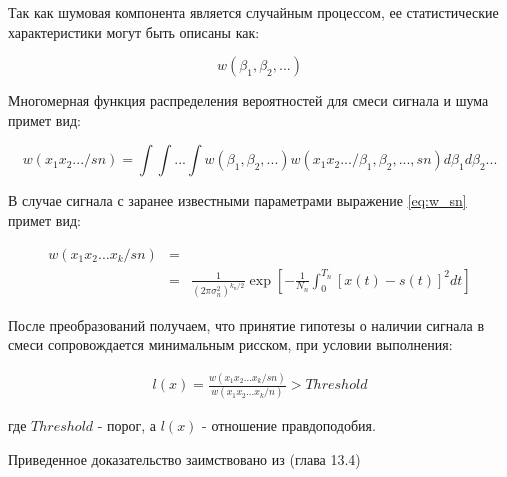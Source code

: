 Так как шумовая компонента является случайным процессом, ее статистические характеристики могут быть описаны как:
\begin{center}
\begin{equation}
	w(\beta_1, \beta_2, ...)
\end{equation}
\end{center}

Многомерная функция распределения вероятностей для смеси сигнала и шума примет вид:
\begin{center}
\begin{equation}
	\label{eq:w_sn}
	w(x_{1}x_{2}.../sn) = \int \int ... \int w(\beta_1, \beta_2, ...)w(x_{1}x_{2}.../ \beta_1, \beta_2, ..., sn) d\beta_1 d\beta_2 ...
\end{equation}
\end{center}

В случае сигнала с заранее известными параметрами выражение \ref{eq:w_sn} примет вид:
\begin{center}
\begin{eqnarray}
	\label{eq:w_sn2}
	w(x_{1}x_{2}...x_{k}/sn) & = & \\
	& = & \frac{1}{(2\pi\sigma_{n}^{2})^{k_n/2}}\exp[-\frac{1}{N_n}\int_{0}^{T_n}[x(t) - s(t)]^2 dt] \nonumber
\end{eqnarray}
\end{center}

После преобразований получаем, что принятие гипотезы о наличии сигнала в смеси сопровождается минимальным рисском, при условии выполнения:
\begin{center}
\begin{eqnarray}
	\label{eq:func_likehood}
	l(x) = \frac{w(x_{1}x_{2}...x_{k}/sn)}{w(x_{1}x_{2}...x_{k}/n)} > Threshold 
\end{eqnarray}
\end{center}
где ${Threshold}$ - порог, а ${l(x)}$ - отношение правдоподобия.

Приведенное доказательство заимствовано из \cite{pugachev} (глава 13.4)

\newpage
